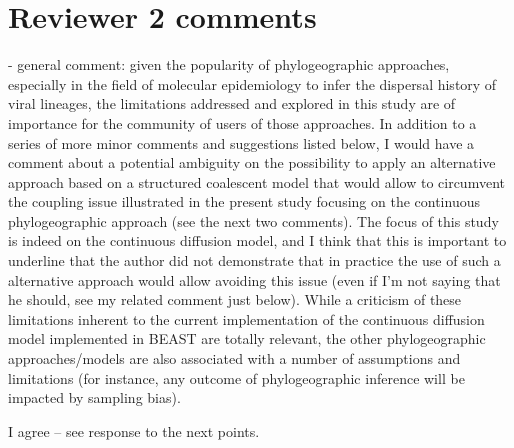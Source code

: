 \documentclass[11pt, oneside]{article}   	%
\newcommand{\response}[1]{{\color{black}{\bf Response:} #1}}
\begin{document}
\section*{Reviewer 2 comments}
- general comment: given the popularity of phylogeographic approaches, especially in the field of molecular epidemiology to infer the dispersal history of viral lineages, the limitations addressed and explored in this study are of importance for the community of users of those approaches. In addition to a series of more minor comments and suggestions listed below, I would have a comment about a potential ambiguity on the possibility to apply an alternative approach based on a structured coalescent model that would allow to circumvent the coupling issue illustrated in the present study focusing on the continuous phylogeographic approach (see the next two comments). The focus of this study is indeed on the continuous diffusion model, and I think that this is important to underline that the author did not demonstrate that in practice the use of such a alternative approach would allow avoiding this issue (even if I'm not saying that he should, see my related comment just below). While a criticism of these limitations inherent to the current implementation of the continuous diffusion model implemented in BEAST are totally relevant, the other phylogeographic approaches/models are also associated with a number of assumptions and limitations (for instance, any outcome of phylogeographic inference will be impacted by sampling bias).

\response{I agree -- see response to the next points.}
\end{document}
